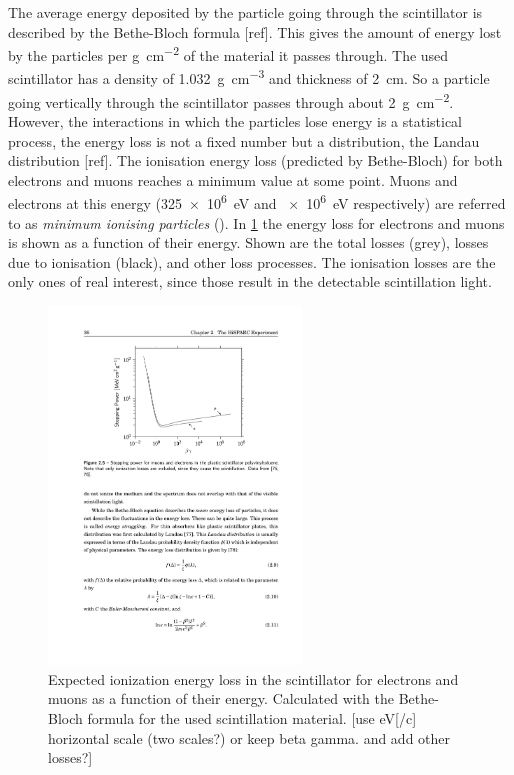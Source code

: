 The average energy deposited by the particle going through the scintillator is described by the Bethe-Bloch formula [ref]. This gives the amount of energy lost by the particles per \si{\gram\per\centi\meter\squared} of the material it passes through. The used scintillator has a density of \SI{1.032}{\gram\per\centi\meter\cubed} and thickness of \SI{2}{\centi\meter}. So a particle going vertically through the scintillator passes through about \SI{2}{\gram\per\centi\meter\squared}. However, the interactions in which the particles lose energy is a statistical process, the energy loss is not a fixed number but a distribution, the Landau distribution [ref]. The ionisation energy loss (predicted by Bethe-Bloch) for both electrons and muons reaches a minimum value at some point. Muons and electrons at this energy (\SI{325e6}{\eV} and \SI{e6}{\eV} respectively) are referred to as \textit{minimum ionising particles} (\mip). In \cref{fig:bethe-bloch} the energy loss for electrons and muons is shown as a function of their energy. Shown are the total losses (grey), losses due to ionisation (black), and other loss processes. The ionisation losses are the only ones of real interest, since those result in the detectable scintillation light.


\begin{figure}
    \centering
    \includegraphics[width=0.6\textwidth]
                    {plots/station/bethe-bloch}
    \caption{Expected ionization energy loss in the scintillator for electrons and muons as a function of their energy. Calculated with the Bethe-Bloch formula for the used scintillation material. [use eV[/c] horizontal scale (two scales?) or keep beta gamma. and add other losses?]}
    \label{fig:bethe-bloch}
\end{figure}

